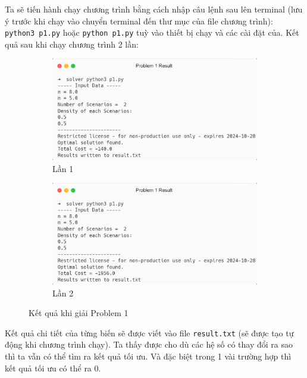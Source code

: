\documentclass[a4paper]{article}
\begin{document}
    Ta sẽ tiến hành chạy chương trình bằng cách nhập câu lệnh sau lên terminal (lưu ý trước khi chạy vào chuyển terminal đến thư mục của file chương trình): \texttt{python3 p1.py} hoặc \texttt{python p1.py} tuỳ vào thiết bị chạy và các cài đặt của. Kết quả sau khi chạy chương trình 2 lần:
    \begin{figure}[h]
        \captionsetup{justification=centering}
        \centering
        \begin{subfigure}[b]{0.45\linewidth}
            \includegraphics[width=\linewidth]{Images/result1.png}
            \caption{Lần 1}
        \end{subfigure}
        \begin{subfigure}[b]{0.45\linewidth}
            \includegraphics[width=\linewidth]{Images/carbon(2).png}
            \caption{Lần 2}
        \end{subfigure}
	\caption{Kết quả khi giải Problem 1}
    \end{figure}

    Kết quả chi tiết của từng biến sẽ được viết vào file \texttt{result.txt} (sẽ được tạo tự động khi chương trình chạy). Ta thấy được cho dù các hệ số có thay đổi ra sao thì ta vẫn có thể tìm ra kết quả tối ưu. Và đặc biệt trong 1 vài trường hợp thì kết quả tối ưu có thể ra 0.
\end{document}
